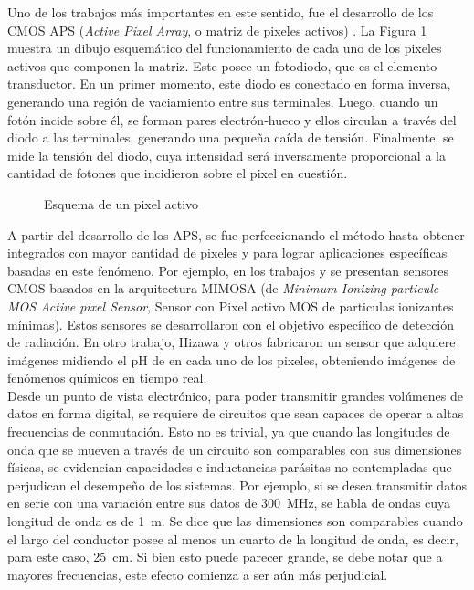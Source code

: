 Uno de los trabajos más importantes en este sentido, fue el desarrollo de los CMOS APS ({\it Active Pixel Array}, o matriz de pixeles activos) \cite{Mendis1994}. La Figura \ref{fig:pix} muestra un dibujo esquemático del funcionamiento de cada uno de los pixeles activos que componen la matriz. Este posee un fotodiodo, que es el elemento transductor. En un primer momento, este diodo es conectado en forma inversa, generando una región de vaciamiento entre sus terminales. Luego, cuando un fotón incide sobre él, se forman pares electrón-hueco y ellos circulan a través del diodo a las terminales, generando una pequeña caída de tensión. Finalmente, se mide la tensión del diodo, cuya intensidad será inversamente proporcional a la cantidad de fotones que incidieron sobre el pixel en cuestión.

\begin{figure}[ht]
	\caption{Esquema de un pixel activo}
	\label{fig:pix}
\end{figure}

A partir del desarrollo de los APS, se fue perfeccionando el método hasta obtener integrados con mayor cantidad de pixeles y para lograr aplicaciones específicas basadas en este fenómeno. Por ejemplo, en los trabajos \cite{Hu-Guo2009} y \cite{Baudot2009} se presentan sensores CMOS basados en la arquitectura MIMOSA (de {\it Minimum Ionizing particule MOS Active pixel Sensor}, Sensor con Pixel activo MOS de particulas ionizantes mínimas). Estos sensores se desarrollaron con el objetivo específico de detección de radiación. En otro trabajo, Hizawa y otros \cite{Hizawa2007} fabricaron un sensor que adquiere imágenes midiendo el pH de en cada uno de los pixeles, obteniendo imágenes de fenómenos químicos en tiempo real.\\

Desde un punto de vista electrónico, para poder transmitir grandes volúmenes de datos en forma digital, se requiere de circuitos que sean capaces de operar a altas frecuencias de conmutación. Esto no es trivial, ya que cuando las longitudes de onda que se mueven a través de un circuito son comparables con sus dimensiones físicas, se evidencian capacidades e inductancias parásitas no contempladas que perjudican el desempeño de los sistemas. Por ejemplo, si se desea transmitir datos en serie con una variación entre sus datos de \SI{300} {\mega\hertz}, se habla de ondas cuya longitud de onda es de \SI{1}{\meter}. Se dice que las dimensiones son comparables cuando el largo del conductor posee al menos un cuarto de la longitud de onda, es decir, para este caso, \SI{25}{\centi\meter}. Si bien esto puede parecer grande, se debe notar que a mayores frecuencias, este efecto comienza a ser aún más perjudicial.\\

